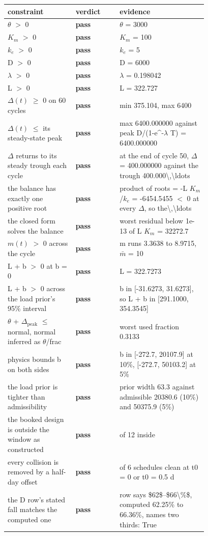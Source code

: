 \begin{tabular}{@{}>{\raggedright\arraybackslash}p{0.34\linewidth}l >{\raggedright\arraybackslash}p{0.44\linewidth}@{}}
\toprule
\textbf{constraint} & \textbf{verdict} & \textbf{evidence} \\
\midrule
$\theta$ $>$ 0 & \textbf{pass} & $\theta$ = 3000 \\
$K_m$ $>$ 0 & \textbf{pass} & $K_m$ = 100 \\
$k_e$ $>$ 0 & \textbf{pass} & $k_e$ = 5 \\
D $>$ 0 & \textbf{pass} & D = 6000 \\
$\lambda$ $>$ 0 & \textbf{pass} & $\lambda$ = 0.198042 \\
L $>$ 0 & \textbf{pass} & L = 322.727 \\
$\Delta(t)$ $\ge$ 0 on 60 cycles & \textbf{pass} & min 375.104, max 6400 \\
$\Delta(t)$ $\le$ its steady-state peak & \textbf{pass} & max 6400.000000 against peak D/(1-e\^{}-$\lambda$ T) = 6400.000000 \\
$\Delta$ returns to its steady trough each cycle & \textbf{pass} & at the end of cycle 50, $\Delta$ = 400.000000 against the trough 400.000\textbackslash{},\textbackslash{}ldots \\
the balance has exactly one positive root & \textbf{pass} & product of roots = -L $K_m$/$k_e$ = -6454.5455 $<$ 0 at every $\Delta$, so the\textbackslash{},\textbackslash{}ldots \\
the closed form solves the balance & \textbf{pass} & worst residual below 1e-13 of L $K_m$ = 32272.7 \\
$m(t)$ $>$ 0 across the cycle & \textbf{pass} & m runs 3.3638 to 8.9715, $\bar m$ = 10 \\
L + b $>$ 0 at b = 0 & \textbf{pass} & L = 322.7273 \\
L + b $>$ 0 across the load prior's 95\% interval & \textbf{pass} & b in [-31.6273, 31.6273], so L + b in [291.1000, 354.3545] \\
$\theta$ + $\Delta_{\mathrm{peak}}$ $\le$ normal, normal inferred as $\theta$/frac & \textbf{pass} & worst used fraction 0.3133 \\
physics bounds b on both sides & \textbf{pass} & b in [-272.7, 20107.9] at 10\%, [-272.7, 50103.2] at 5\% \\
the load prior is tighter than admissibility & \textbf{pass} & prior width 63.3 against admissible 20380.6 (10\%) and 50375.9 (5\%) \\
the booked design is outside the window as constructed & \textbf{pass} & 0 of 12 inside \\
every collision is removed by a half-day offset & \textbf{pass} & 6 of 6 schedules clean at t0 = 0 or t0 = 0.5 d \\
the D row's stated fall matches the computed one & \textbf{pass} & row says \$62\$--\$66\textbackslash{}\%\$, computed 62.25\% to 66.36\%, names two thirds: True \\
\bottomrule
\end{tabular}

